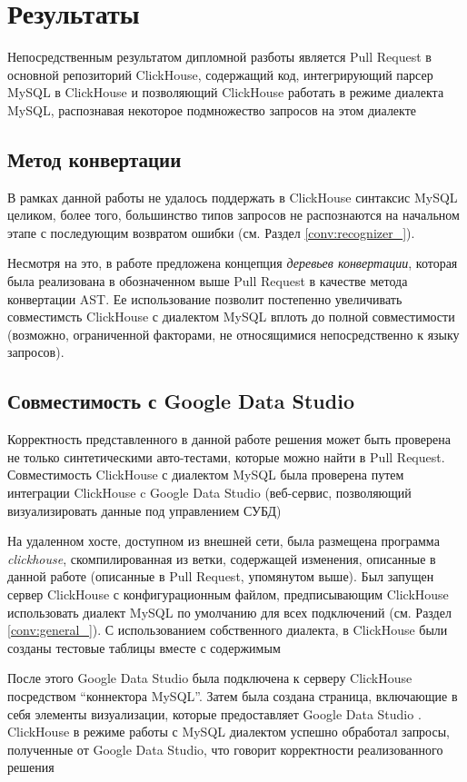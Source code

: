 \section{Результаты} \label{chap:results}
Непосредственным результатом дипломной разботы является Pull Request в основной репозиторий ClickHouse, содержащий код, интегрирующий парсер MySQL в ClickHouse и позволяющий ClickHouse работать в режиме диалекта MySQL, распознавая некоторое подмножество запросов на этом диалекте

\subsection{Метод конвертации}
В рамках данной работы не удалось поддержать в ClickHouse синтаксис MySQL целиком, более того, большинство типов запросов не распознаются на начальном этапе с последующим возвратом ошибки (см. Раздел \ref{conv:recognizer_}).

Несмотря на это, в работе предложена концепция \textit{деревьев конвертации}, которая была реализована в обозначенном выше Pull Request в качестве метода конвертации AST. Ее использование позволит постепенно увеличивать совместимсть ClickHouse с диалектом MySQL вплоть до полной совместимости (возможно, ограниченной факторами, не относящимися непосредственно к языку запросов). 

\subsection{Совместимость с Google Data Studio} \label{res:google}
Корректность представленного в данной работе решения может быть проверена не только синтетическими авто-тестами, которые можно найти в Pull Request. Совместимость ClickHouse с диалектом MySQL была проверена путем интеграции ClickHouse c Google Data Studio (веб-сервис, позволяющий визуализировать данные под управлением СУБД)

На удаленном хосте, доступном из внешней сети, была размещена программа \textit{clickhouse}, скомпилированная из ветки, содержащей изменения, описанные в данной работе (описанные в Pull Request, упомянутом выше). Был запущен сервер ClickHouse с конфигурационным файлом, предписывающим ClickHouse использовать диалект MySQL по умолчанию для всех подключений (см. Раздел \ref{conv:general_}). С использованием собственного диалекта, в ClickHouse были созданы тестовые таблицы вместе с содержимым

После этого Google Data Studio была подключена к серверу ClickHouse посредством \enquote{коннектора MySQL}. Затем была создана страница, включающие в себя элементы визуализации, которые предоставляет Google Data Studio \cite{data_studio_test}. ClickHouse в режиме работы с MySQL диалектом успешно обработал запросы, полученные от Google Data Studio, что говорит корректности реализованного решения

